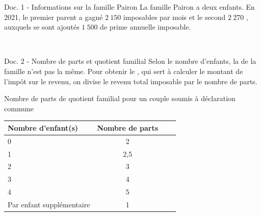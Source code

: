 \documentclass[11pt,a4paper]{article}  %
\begin{document}

\begin{consequences}{Doc. 1 - Informations sur la famille Pairon}
	La famille Pairon a deux enfants.
	En 2021, le premier parent a gagné $2\ 150$ \EUR{} imposables par mois et le second $2\ 270$ \EUR{}, auxquels se sont ajoutés $1\ 500$ \EUR{} de prime annuelle imposable.
\end{consequences}
\ \\

\begin{consequences}{Doc. 2 - Nombre de parts et quotient familial}
	Selon le nombre d'enfants, la  de la famille n'est pas la même. Pour obtenir le , qui sert à calculer le montant de l'impôt sur le revenu, on divise le revenu total imposable par le nombre de parts.\\
	\begin{center}
		Nombre de parts de quotient familial pour un couple soumis à déclaration commune\\
		\begin{tabular}{|Xc|Xc|}
			\hline Nombre d'enfant(s) & Nombre de parts \\
			\hline 0 & 2 \\
			\hline 1 & 2,5 \\
			\hline 2 & 3 \\
			\hline 3 & 4 \\
			\hline 4 & 5 \\
			\hline Par enfant supplémentaire & 1 \\
			\hline
		\end{tabular}
	\end{center}
\end{consequences}
\vspace*{-0.2cm}
\ \\
\end{document}
